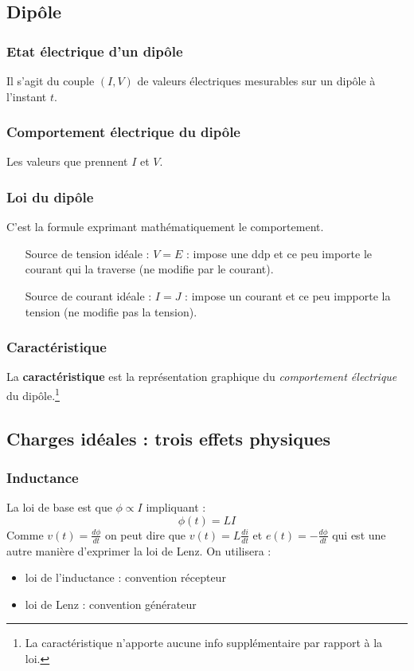 \documentclass	[11pt, a4paper, openany]{book}
\begin{document}
\subsection{Dipôle}
\subsubsection{Etat électrique d'un dipôle}
Il s'agit du couple $(I,V)$ de valeurs électriques mesurables sur un dipôle à l'instant $t$.

\subsubsection{Comportement électrique du dipôle}
Les valeurs que prennent $I$ et $V$.

\subsubsection{Loi du dipôle}
C'est la formule exprimant mathématiquement le comportement.
\begin{itemize}
\item[Source de tension idéale] : $V = E$ : impose une ddp et ce peu importe le courant qui la traverse (ne modifie par le courant).
\item[Source de courant idéale] : $I = J$ : impose un courant et ce peu impporte la tension (ne modifie pas la tension).
\end{itemize}

\subsubsection{Caractéristique}
La \textbf{caractéristique} est la représentation graphique du \textit{comportement électrique} du dipôle.\footnote{La caractéristique n'apporte aucune info supplémentaire par rapport à la loi.}

\setcounter{section}{2}
\subsection{Charges idéales : trois effets physiques}
\setcounter{subsection}{1}
\subsubsection{Inductance}
La loi de base est que $\phi \propto I$ impliquant :
\begin{equation}
\phi (t) = LI
\end{equation}
Comme $v(t) = \frac{d\phi}{dt}$ on peut dire que $v(t) = L\frac{di}{dt}$ et $e(t) = -\frac{d\phi}{dt}$ qui est une autre manière d'exprimer la loi de Lenz. On utilisera :
\begin{itemize}
\item loi de l'inductance : convention récepteur
\item loi de Lenz : convention générateur
\end{itemize}
\end{document}
